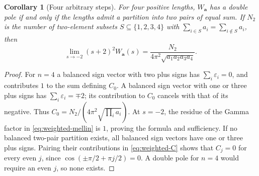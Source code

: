 \documentclass[11pt]{amsart}
\newtheorem{corollary}[thm]{Corollary}
\theoremstyle{definition}
\begin{document}
\begin{corollary}[Four arbitrary steps]\label{cor:four-weighted}
For four positive lengths, $W_{\boldsymbol a}$ has a double pole if and
only if the lengths admit a partition into two pairs of equal sum.
If $N_2$ is the number of two-element subsets $S\subseteq\{1,2,3,4\}$
with $\sum_{i\in S}a_i=\sum_{i\notin S}a_i$, then
\[
 \lim_{s\to-2}(s+2)^2W_{\boldsymbol a}(s)
 =\frac{N_2}{4\pi^2\sqrt{a_1a_2a_3a_4}}.
\]
\end{corollary}
\begin{proof}
For $n=4$ a balanced sign vector with two plus signs has
$\sum_i\varepsilon_i=0$, and contributes $1$ to the sum defining $C_0$.
A balanced sign vector with one or three plus signs has
$\sum_i\varepsilon_i=\mp2$; its contribution to $C_0$ cancels with
that of its negative. Thus
$C_0=N_2/(4\pi^2\sqrt{\prod_i a_i})$.
At $s=-2$, the residue of the Gamma factor in
\eqref{eq:weighted-mellin} is $1$, proving the formula and sufficiency.
If no balanced two-pair partition exists, all balanced sign vectors
have one or three plus signs. Pairing their contributions in
\eqref{eq:weighted-C} shows that $C_j=0$ for every even $j$,
since $\cos(\pm\pi/2+\pi j/2)=0$. A double pole for $n=4$ would require
an even $j$, so none exists.
\end{proof}
\end{document}

